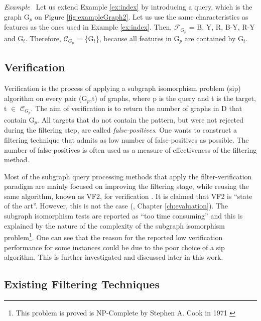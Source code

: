\documentclass{l4proj}
\newcounter{example}[section]
\newenvironment{example}[1][]{\refstepcounter{example}\par\medskip
   \noindent \textit{Example~\theexample #1} \rmfamily}{\medskip}
\newcommand{\fancyC}{\mathcal{C}}
\newcommand{\fancyF}{\mathcal{F}}
\begin{document}
\begin{example}
Let us extend Example \ref{ex:index} by introducing a query, which is the graph G$_{p}$ on Figure \ref{fig:exampleGraph2}. Let us use the same characteristics as features as the ones used in Example \ref{ex:index}. Then, $\fancyF_{G_{p}}$ = B, Y, R, B-Y, R-Y and G$_{t}$. Therefore, $\fancyC_{G_{p}}$ = \{G$_{t}$\}, because all features in G$_{p}$ are contained by G$_{t}$.
\end{example}

\subsection{Verification}
Verification is the process of applying a subgraph isomorphism problem (\gls{sip}) algorithm on every pair (G$_{p}$,t) of graphs, where p is the query and t is the target, t $\in$ $\fancyC_{G_{p}}$. The aim of verification is to return the number of graphs in D that contain G$_{p}$. All targets that do not contain the pattern, but were not rejected during the filtering step, are called \emph{false-positives}. One wants to construct a filtering technique that admits as low number of false-positives as possible. The number of false-positives is often used as a measure of effectiveness of the filtering method\cite{foteini}.

Most of the subgraph query processing methods that apply the filter-verification paradigm are mainly focused on improving the filtering stage, while reusing the same algorithm, known as VF2, for verification \cite{foteini}. 
It is claimed that VF2 is ``state of the art''\cite{ctindex}. However, this is not the case (\cite{Solnon:2010, Larrosa:2002, Bonnici:2013, Zampelli:2010, CP2015}, Chapter \ref{ch:evaluation}). The subgraph isomorphism tests are reported as ``too time consuming''\cite{foteini} and this is explained by the nature of the complexity of the subgraph isomorphism problem\footnote{This problem is proved is NP-Complete by Stephen A. Cook in 1971 \cite{Cook:1971}}\cite{ctindex,foteini,freqStructBasedIndexing}. One can see that the reason for the reported low verification performance for some instances could be due to the poor choice of a \gls{sip} algorithm. This is further investigated and discussed later in this work.

\subsection{Existing Filtering Techniques}
\label{subse:existingFVtechniques}
\end{document}
